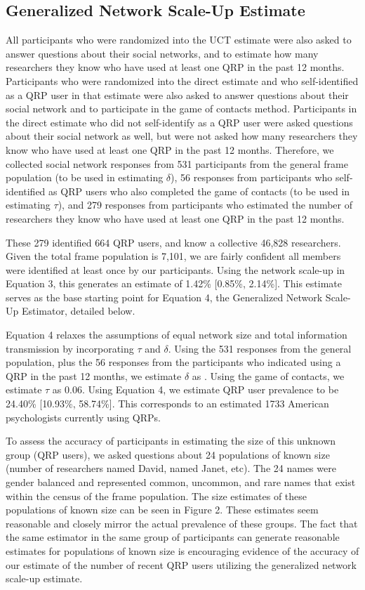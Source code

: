 \documentclass[,jou]{apa6}
\theoremstyle{definition}
\theoremstyle{definition}
\theoremstyle{definition}
\theoremstyle{remark}
\begin{document}
\subsection{Generalized Network Scale-Up
Estimate}\label{generalized-network-scale-up-estimate}

All participants who were randomized into the UCT estimate were also
asked to answer questions about their social networks, and to estimate
how many researchers they know who have used at least one QRP in the
past 12 months. Participants who were randomized into the direct
estimate and who self-identified as a QRP user in that estimate were
also asked to answer questions about their social network and to
participate in the game of contacts method. Participants in the direct
estimate who did not self-identify as a QRP user were asked questions
about their social network as well, but were not asked how many
researchers they know who have used at least one QRP in the past 12
months. Therefore, we collected social network responses from 531
participants from the general frame population (to be used in estimating
\(\delta\)), 56 responses from participants who self-identified as QRP
users who also completed the game of contacts (to be used in estimating
\(\tau\)), and 279 responses from participants who estimated the number
of researchers they know who have used at least one QRP in the past 12
months.

These 279 identified 664 QRP users, and know a collective 46,828
researchers. Given the total frame population is 7,101, we are fairly
confident all members were identified at least once by our participants.
Using the network scale-up in Equation 3, this generates an estimate of
1.42\% {[}0.85\%, 2.14\%{]}. This estimate serves as the base starting
point for Equation 4, the Generalized Network Scale-Up Estimator,
detailed below.

Equation 4 relaxes the assumptions of equal network size and total
information transmission by incorporating \(\tau\) and \(\delta\). Using
the 531 responses from the general population, plus the 56 responses
from the participants who indicated using a QRP in the past 12 months,
we estimate \(\delta\) as . Using the game of contacts, we estimate
\(\tau\) as 0.06. Using Equation 4, we estimate QRP user prevalence to
be 24.40\% {[}10.93\%, 58.74\%{]}. This corresponds to an estimated 1733
American psychologists currently using QRPs.

To assess the accuracy of participants in estimating the size of this
unknown group (QRP users), we asked questions about 24 populations of
known size (number of researchers named David, named Janet, etc). The 24
names were gender balanced and represented common, uncommon, and rare
names that exist within the census of the frame population. The size
estimates of these populations of known size can be seen in Figure 2.
These estimates seem reasonable and closely mirror the actual prevalence
of these groups. The fact that the same estimator in the same group of
participants can generate reasonable estimates for populations of known
size is encouraging evidence of the accuracy of our estimate of the
number of recent QRP users utilizing the generalized network scale-up
estimate.
\end{document}
